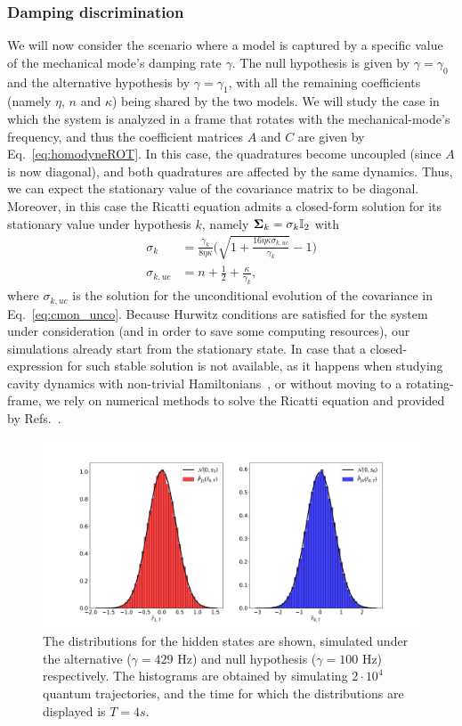\subsubsection{Damping discrimination}
We will now consider the scenario where a model is captured by a specific value of the mechanical mode's damping rate $\gamma$. The null hypothesis is given by $\gamma = \gamma_0$ and the alternative hypothesis by $\gamma = \gamma_1$, with all the remaining coefficients (namely $\eta$, $n$ and $\kappa$) being shared by the two models. We will study the case in which the system is analyzed in a frame that rotates with the mechanical-mode's frequency, and thus the coefficient matrices $A$ and $C$ are given by Eq.~\ref{eq:homodyneROT}. In this case, the quadratures become uncoupled (since $A$ is now diagonal), and both quadratures are affected by the same dynamics. Thus, we can expect the stationary value of the covariance matrix to be diagonal. Moreover, in this case the Ricatti equation admits a closed-form solution for its stationary value under hypothesis $k$, namely $\bm{\Sigma}_k = \sigma_k \mathbb{I}_2$ with
\begin{align}\label{eq:stat_cov_damping}
\sigma_k &= \frac{\gamma_k}{8\eta \kappa}\Big(\sqrt{1 + \frac{16 \eta \kappa \sigma_{k,uc}}{\gamma_k}} -1 \Big) \\
\sigma_{k,uc} &= n + \frac{1}{2} + \frac{\kappa}{\gamma_k},
\end{align}
where $\sigma_{k,uc}$ is the solution for the unconditional evolution of the covariance in Eq.~\eqref{eq:cmon_unco}. Because Hurwitz conditions are satisfied for the system under consideration (and in order to save some computing resources), our simulations already start from the stationary state. In case that a closed-expression for such stable solution is not available, as it happens when studying cavity dynamics with non-trivial Hamiltonians~\cite{Fallani2022Learning}, or without moving to a rotating-frame, we rely on numerical methods to solve the Ricatti equation and provided by Refs.~\cite{scipy,schurCARE}.

\begin{figure}[t!]
    \centering
    \includegraphics[width=1.\textwidth]{Figures/CMON/damp-discri/distributions_hidden.pdf}
    \caption{The distributions for the hidden states are shown, simulated under the alternative ($\gamma = 429 $ Hz) and null hypothesis ($\gamma = 100$ Hz) respectively. The histograms are obtained by simulating $2 \cdot10^{4}$ quantum trajectories, and the time for which the distributions are displayed is $T=4s$.}
    \label{fig:cmon_distributions_hidden}
\end{figure}

